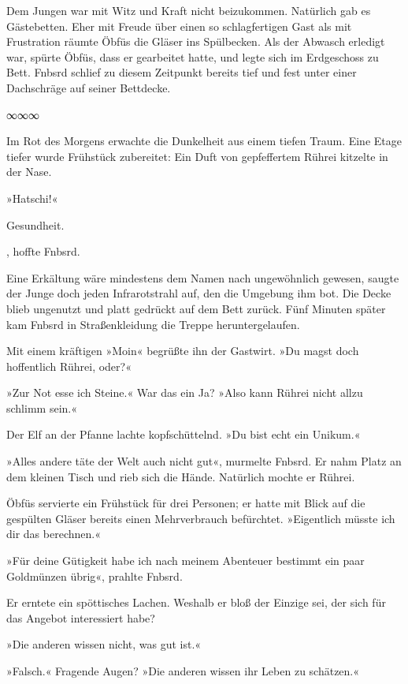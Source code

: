 Dem Jungen war mit Witz und Kraft nicht beizukommen. Natürlich gab es Gästebetten. Eher mit Freude über einen so schlagfertigen Gast als mit Frustration räumte Öbfüs die Gläser ins Spülbecken. Als der Abwasch erledigt war, spürte Öbfüs, dass er gearbeitet hatte, und legte sich im Erdgeschoss zu Bett. Fnbsrd schlief zu diesem Zeitpunkt bereits tief und fest unter einer Dachschräge auf seiner Bettdecke.

\begin{center}
∞∞∞
\end{center}

Im Rot des Morgens erwachte die Dunkelheit aus einem tiefen Traum. Eine Etage tiefer wurde Frühstück zubereitet: Ein Duft von gepfeffertem Rührei kitzelte in der Nase.

»Hatschi!«

Gesundheit.

, hoffte Fnbsrd. 

Eine Erkältung wäre mindestens dem Namen nach ungewöhnlich gewesen, saugte der Junge doch jeden Infrarotstrahl auf, den die Umgebung ihm bot. Die Decke blieb ungenutzt und platt gedrückt auf dem Bett zurück. Fünf Minuten später kam Fnbsrd in Straßenkleidung die Treppe heruntergelaufen.

Mit einem kräftigen »Moin« begrüßte ihn der Gastwirt. »Du magst doch hoffentlich Rührei, oder?«

»Zur Not esse ich Steine.« War das ein Ja? »Also kann Rührei nicht allzu schlimm sein.«

Der Elf an der Pfanne lachte kopfschüttelnd. »Du bist echt ein Unikum.«

»Alles andere täte der Welt auch nicht gut«, murmelte Fnbsrd. Er nahm Platz an dem kleinen Tisch und rieb sich die Hände. Natürlich mochte er Rührei.

Öbfüs servierte ein Frühstück für drei Personen; er hatte mit Blick auf die gespülten Gläser bereits einen Mehrverbrauch befürchtet. »Eigentlich müsste ich dir das berechnen.«

»Für deine Gütigkeit habe ich nach meinem Abenteuer bestimmt ein paar Goldmünzen übrig«, prahlte Fnbsrd.

Er erntete ein spöttisches Lachen. Weshalb er bloß der Einzige sei, der sich für das Angebot interessiert habe?

»Die anderen wissen nicht, was gut ist.«

»Falsch.« Fragende Augen? »Die anderen wissen ihr Leben zu schätzen.«

